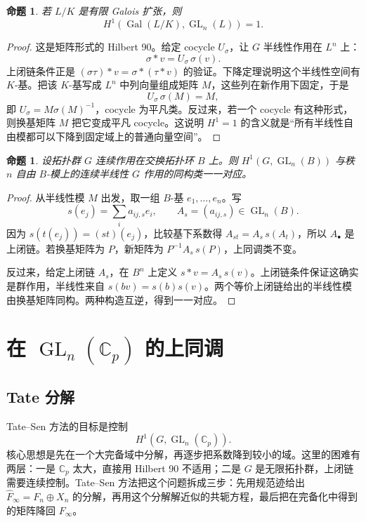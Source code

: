 \documentclass[11pt,a4paper,openany]{ctexbook}
\numberwithin{equation}{chapter}
\newcommand{\C}{\mathbb{C}}
\newcommand{\Gal}{\operatorname{Gal}}
\newcommand{\GL}{\operatorname{GL}}
\theoremstyle{plain}
\newtheorem{proposition}[theorem]{命题}
\theoremstyle{definition}
\theoremstyle{remark}
\begin{document}
\begin{proposition}
若 $L/K$ 是有限 Galois 扩张，则
\[
  H^1(\Gal(L/K),\GL_n(L))=1.
\]
\end{proposition}

\begin{proof}
这是矩阵形式的 Hilbert 90。给定 cocycle $U_\sigma$，让 $G$ 半线性作用在 $L^n$ 上：
\[
  \sigma * v=U_\sigma\,\sigma(v).
\]
上闭链条件正是 $(\sigma\tau)*v=\sigma*(\tau*v)$ 的验证。下降定理说明这个半线性空间有 $K$-基。把该 $K$-基写成 $L^n$ 中列向量组成矩阵 $M$，这些列在新作用下固定，于是
\[
  U_\sigma\,\sigma(M)=M,
\]
即 $U_\sigma=M\sigma(M)^{-1}$，cocycle 为平凡类。反过来，若一个 cocycle 有这种形式，则换基矩阵 $M$ 把它变成平凡 cocycle。这说明 $H^1=1$ 的含义就是“所有半线性自由模都可以下降到固定域上的普通向量空间”。
\end{proof}

\begin{proposition}
设拓扑群 $G$ 连续作用在交换拓扑环 $B$ 上。则 $H^1(G,\GL_n(B))$ 与秩 $n$ 自由 $B$-模上的连续半线性 $G$ 作用的同构类一一对应。
\end{proposition}

\begin{proof}
从半线性模 $M$ 出发，取一组 $B$-基 $e_1,\ldots,e_n$。写
\[
  s(e_j)=\sum_i a_{ij,s}e_i,\qquad A_s=(a_{ij,s})\in\GL_n(B).
\]
因为 $s(t(e_j))=(st)(e_j)$，比较基下系数得 $A_{st}=A_s\,s(A_t)$，所以 $A_\bullet$ 是上闭链。若换基矩阵为 $P$，新矩阵为 $P^{-1}A_s\,s(P)$，上同调类不变。

反过来，给定上闭链 $A_s$，在 $B^n$ 上定义 $s*v=A_s\,s(v)$。上闭链条件保证这确实是群作用，半线性来自 $s(bv)=s(b)s(v)$。两个等价上闭链给出的半线性模由换基矩阵同构。两种构造互逆，得到一一对应。
\end{proof}

\section{在 \texorpdfstring{$\GL_n(\C_p)$}{GLn(Cp)} 的上同调}

\subsection{Tate 分解}

Tate--Sen 方法的目标是控制
\[
  H^1(G,\GL_n(\C_p)).
\]
核心思想是先在一个大完备域中分解，再逐步把系数降到较小的域。这里的困难有两层：一是 $\C_p$ 太大，直接用 Hilbert 90 不适用；二是 $G$ 是无限拓扑群，上闭链需要连续控制。Tate--Sen 方法把这个问题拆成三步：先用规范迹给出 $\widehat F_\infty=F_n\oplus X_n$ 的分解，再用这个分解解近似的共轭方程，最后把在完备化中得到的矩阵降回 $F_\infty$。
\end{document}
